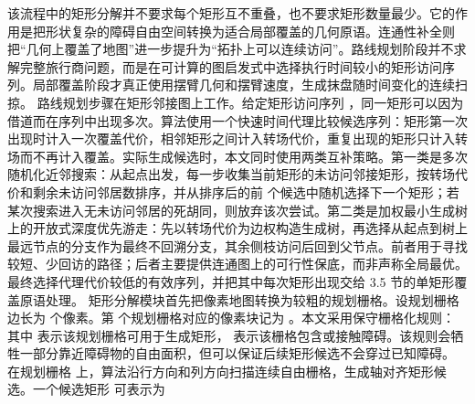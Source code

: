 {}该流程中的矩形分解并不要求每个矩形互不重叠，也不要求矩形数量最少。它的作用是把形状复杂的障碍自由空间转换为适合局部覆盖的几何原语。连通性补全则把“几何上覆盖了地图”进一步提升为“拓扑上可以连续访问”。路线规划阶段并不求解完整旅行商问题，而是在可计算的图启发式中选择执行时间较小的矩形访问序列。局部覆盖阶段才真正使用摆臂几何和摆臂速度，生成抹盘随时间变化的连续扫掠。\markdownRendererParagraphSeparator
{}路线规划步骤在矩形邻接图上工作。给定矩形访问序列 ，同一矩形可以因为借道而在序列中出现多次。算法使用一个快速时间代理比较候选序列：矩形第一次出现时计入一次覆盖代价，相邻矩形之间计入转场代价，重复出现的矩形只计入转场而不再计入覆盖。实际生成候选时，本文同时使用两类互补策略。第一类是多次随机化近邻搜索：从起点出发，每一步收集当前矩形的未访问邻接矩形，按转场代价和剩余未访问邻居数排序，并从排序后的前  个候选中随机选择下一个矩形；若某次搜索进入无未访问邻居的死胡同，则放弃该次尝试。第二类是加权最小生成树上的开放式深度优先游走：先以转场代价为边权构造生成树，再选择从起点到树上最远节点的分支作为最终不回溯分支，其余侧枝访问后回到父节点。前者用于寻找较短、少回访的路径；后者主要提供连通图上的可行性保底，而非声称全局最优。最终选择代理代价较低的有效序列，并把其中每次矩形出现交给 3.5 节的单矩形覆盖原语处理。\markdownRendererParagraphSeparator
{}
\markdownRendererSectionEnd \markdownRendererSectionBegin
{}\markdownRendererParagraphSeparator
{}矩形分解模块首先把像素地图转换为较粗的规划栅格。设规划栅格边长为  个像素。第  个规划栅格对应的像素块记为 。本文采用保守栅格化规则：\markdownRendererParagraphSeparator
{}\markdownRendererParagraphSeparator
{}其中  表示该规划栅格可用于生成矩形， 表示该栅格包含或接触障碍。该规则会牺牲一部分靠近障碍物的自由面积，但可以保证后续矩形候选不会穿过已知障碍。\markdownRendererParagraphSeparator
{}在规划栅格  上，算法沿行方向和列方向扫描连续自由栅格，生成轴对齐矩形候选。一个候选矩形  可表示为\markdownRendererParagraphSeparator
{}\markdownRendererParagraphSeparator
